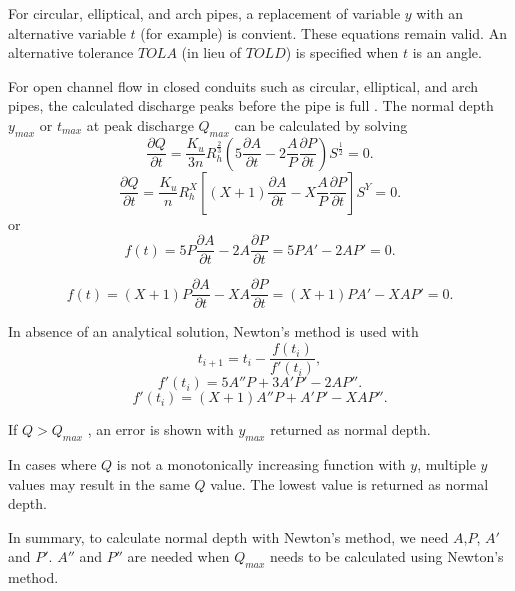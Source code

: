 \noindent For circular, elliptical, and arch pipes, a replacement of variable $y$ with an alternative variable $t$ (for example) is convient. These equations remain valid. An alternative tolerance $TOLA$ (in lieu of $TOLD$) is specified when $t$ is an angle.

For open channel flow in closed conduits such as circular, elliptical, and arch pipes, the calculated discharge peaks before the pipe is full \cite{Chow1959,French1985,Munson2013}. 
The normal depth $y_{max}$ or $t_{max}$ at peak discharge $Q_{max}$ can be calculated by solving
\begin{equation}  
\frac{\partial Q}{\partial t} = \frac{K_u}{3n} R_h^{\frac{2}{3}} \left(5\frac{\partial A}{\partial t} -  2 \frac{A}{P}\frac{\partial P}{\partial t}\right) S^{\frac{1}{2}}=0.
\end{equation}
\begin{equation}  
\frac{\partial Q}{\partial t} = \frac{K_u}{n} R_h^X \left[(X + 1)\frac{\partial A}{\partial t} - X \frac{A}{P}\frac{\partial P}{\partial t}\right] S^Y=0.
\end{equation}
or
\begin{equation}  
f(t) = 5P\frac{\partial A}{\partial t} -  2 A\frac{\partial P}{\partial t} = 5PA' -  2 AP' = 0.
\label{Eq:MaxQ}
\end{equation}

\begin{equation}  
f(t) = (X+1)P\frac{\partial A}{\partial t} -  X A\frac{\partial P}{\partial t} = (X + 1)PA' -  X AP' = 0.
\end{equation}

\noindent In absence of an analytical solution, Newton's method is used with
\begin{equation}  
t _{i+1} = t _i - \frac{f(t _i)}{f'(t_i)},
\end{equation}
\begin{equation}  
f'(t_i) = 5A''P  + 3A'P' - 2AP''.
\end{equation}
\begin{equation}  
f'(t_i) = (X+1)A''P  + A'P' - XAP''.
\end{equation}

\noindent If $Q > Q_{max}$ , an error is shown with $y_{max}$ returned as normal depth.  

\noindent In cases where $Q$ is not a monotonically increasing function with $y$, multiple $y$ values may result in the same $Q$ value. The lowest value is returned as normal depth. 

\noindent In summary, to calculate normal depth with Newton's method, we need $A$,$P$, $A'$ and $ P'$. $A''$ and $P''$ are needed when $Q_{max}$ needs to be calculated using Newton's method.

